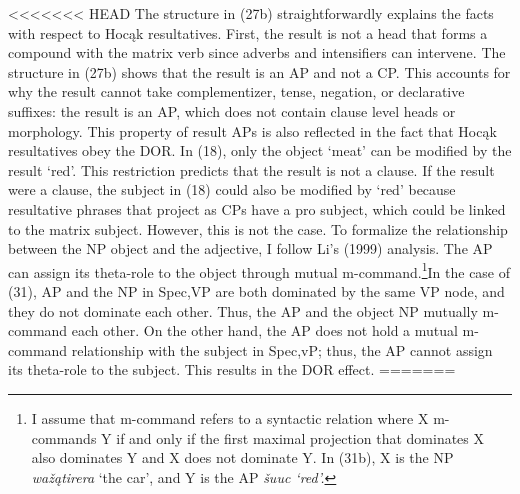 \documentclass[output=paper]{LSP/langsci}
\begin{document}
\begin{exe}
\begin{exe}
\begin{exe}
\begin{exe}
{\begin{exe}
<<<<<<< HEAD
The structure in (27b) straightforwardly explains the facts with respect to Hocąk resultatives. First, the result is not a head that forms a compound with the matrix verb since adverbs and intensifiers can intervene. The structure in (27b) shows that the result is an AP and not a CP. This accounts for why the result cannot take complementizer, tense, negation, or declarative suffixes: the result is an AP, which does not contain clause level heads or morphology. This property of result APs is also reflected in the fact that Hocąk resultatives obey the DOR. In (18), only the object `meat' can be modified by the result `red'. This restriction predicts that the result is not a clause. If the result were a clause, the subject in (18) could also be modified by `red' because resultative phrases that project as CPs have a pro subject, which could be linked to the matrix subject. However, this is not the case. To formalize the relationship between the NP object and the adjective, I follow Li's (1999) analysis. The AP can assign its theta-role to the object through mutual m-command.\footnote{I assume that m-command refers to a syntactic relation where X m-commands Y if and only if the first maximal projection that dominates X also dominates Y and X does not dominate Y. In (31b), X is the NP \textit{wažątirera} `the car', and Y is the AP \textit{šuuc `red'.}}In the case of (31), AP and the NP in Spec,VP are both dominated by the same VP node, and they do not dominate each other. Thus, the AP and the object NP mutually m-command each other. On the other hand, the AP does not hold a mutual m-command relationship with the subject in Spec,vP; thus, the AP cannot assign its theta-role to the subject. This results in the DOR effect.
=======

\end{exe}}
\end{exe}
\end{exe}
\end{exe}
\end{exe}
\end{document}
